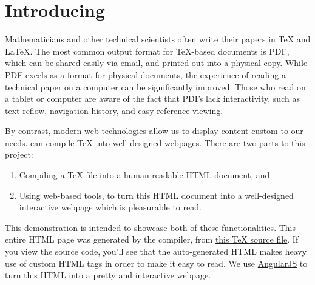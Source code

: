 \documentclass[11pt]{article}
\begin{document}
\tableofcontents

\section{Introducing \DiscoTeX}
Mathematicians and other technical scientists often write their papers in \TeX{} and \LaTeX.
The most common output format for \TeX{}-based documents is PDF, which can be shared easily via email, and printed out into a physical copy.
While PDF excels as a format for physical documents, the experience of reading a technical paper on a computer can be significantly improved.
Those who read on a tablet or computer are aware of the fact that PDFs lack interactivity, such as text reflow, navigation history, and easy reference viewing.

By contrast, modern web technologies allow us to display content custom to our needs.
\DiscoTeX{} can compile \TeX{} into well-designed webpages.
There are two parts to this project:
\begin{enumerate}
    \item Compiling a \TeX{} file into a human-readable HTML document, and
    \item Using web-based tools, to turn this HTML document into a well-designed interactive webpage which is pleasurable to read.
\end{enumerate}
This demonstration is intended to showcase both of these functionalities.
This entire HTML page was generated by the \DiscoTeX{} compiler, from \href{demo.tex}{this \TeX{} source file}.
If you view the source code, you'll see that the auto-generated HTML makes heavy use of custom HTML tags in order to make it easy to read.
We use \href{https://angularjs.org/}{AngularJS} to turn this HTML into a pretty and interactive webpage.
\end{document}
